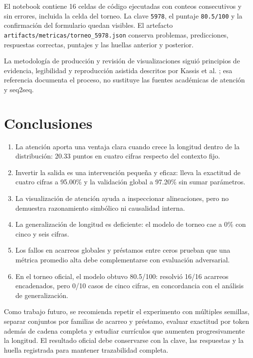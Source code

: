 \documentclass[11pt,letterpaper]{article}
\newcommand{\code}[1]{\texttt{#1}}
\begin{document}
El notebook contiene 16 celdas de código ejecutadas con conteos consecutivos y sin errores, incluida la
celda del torneo. La clave \code{5978}, el puntaje \code{80.5/100} y la confirmación del formulario quedan
visibles. El artefacto \code{artifacts/metricas/torneo\_5978.json} conserva problemas, predicciones,
respuestas correctas, puntajes y las huellas anterior y posterior.

La metodología de producción y revisión de visualizaciones siguió principios de evidencia, legibilidad y
reproducción asistida descritos por Kassis et al. \cite{kassis2026}; esa referencia documenta el proceso,
no sustituye las fuentes académicas de atención y seq2seq.

\section{Conclusiones}

\begin{enumerate}
  \item La atención aporta una ventaja clara cuando crece la longitud dentro de la distribución: 20.33
  puntos en cuatro cifras respecto del contexto fijo.
  \item Invertir la salida es una intervención pequeña y eficaz: lleva la exactitud de cuatro cifras a
  95.00\% y la validación global a 97.20\% sin sumar parámetros.
  \item La visualización de atención ayuda a inspeccionar alineaciones, pero no demuestra razonamiento
  simbólico ni causalidad interna.
  \item La generalización de longitud es deficiente: el modelo de torneo cae a 0\% con cinco y seis cifras.
  \item Los fallos en acarreos globales y préstamos entre ceros prueban que una métrica promedio alta debe
  complementarse con evaluación adversarial.
  \item En el torneo oficial, el modelo obtuvo 80.5/100: resolvió 16/16 acarreos encadenados, pero 0/10
  casos de cinco cifras, en concordancia con el análisis de generalización.
\end{enumerate}

Como trabajo futuro, se recomienda repetir el experimento con múltiples semillas, separar conjuntos por
familias de acarreo y préstamo, evaluar exactitud por token además de cadena completa y estudiar currículos
que aumenten progresivamente la longitud. El resultado oficial debe conservarse con la clave, las respuestas
y la huella registrada para mantener trazabilidad completa.
\end{document}
